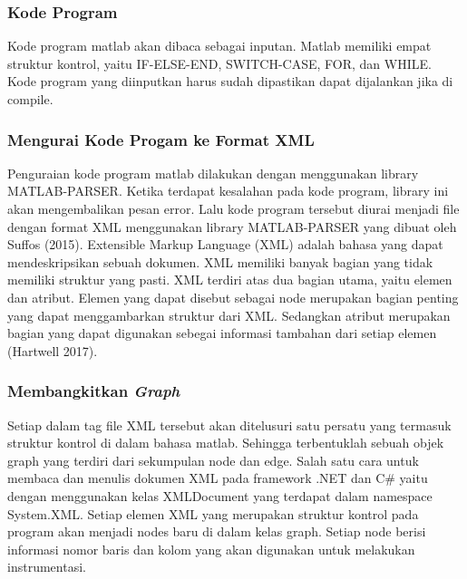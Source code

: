 \subsubsection*{Kode Program}
Kode program matlab akan dibaca sebagai inputan. Matlab memiliki empat struktur kontrol, yaitu IF-ELSE-END, SWITCH-CASE, FOR, dan WHILE. Kode program yang diinputkan harus sudah dipastikan dapat dijalankan jika di compile.

\subsubsection*{Mengurai Kode Progam ke Format XML}
Penguraian kode program matlab dilakukan dengan menggunakan library  MATLAB-PARSER. Ketika terdapat kesalahan pada kode program, library  ini akan mengembalikan pesan error. Lalu kode program tersebut diurai menjadi file dengan format XML menggunakan library MATLAB-PARSER yang dibuat oleh Suffos (2015). 
Extensible Markup Language (XML) adalah bahasa yang dapat mendeskripsikan sebuah dokumen. XML memiliki banyak bagian yang tidak memiliki struktur yang pasti. XML terdiri atas dua bagian utama, yaitu elemen dan atribut. Elemen yang dapat disebut sebagai node merupakan bagian penting yang dapat menggambarkan struktur dari XML. Sedangkan atribut merupakan bagian yang dapat digunakan sebegai informasi tambahan dari setiap elemen (Hartwell 2017). 

\subsubsection*{Membangkitkan \textit{Graph}}
Setiap dalam tag file XML tersebut akan ditelusuri satu persatu yang termasuk struktur kontrol di dalam bahasa matlab. Sehingga terbentuklah sebuah objek graph yang terdiri dari sekumpulan node dan edge. 
Salah satu cara untuk membaca dan menulis dokumen XML pada framework .NET dan C\# yaitu dengan menggunakan kelas XMLDocument yang terdapat dalam namespace System.XML. Setiap elemen XML yang merupakan struktur kontrol pada program akan menjadi nodes baru di dalam kelas graph. Setiap node berisi informasi nomor baris dan kolom yang akan digunakan untuk melakukan instrumentasi.


